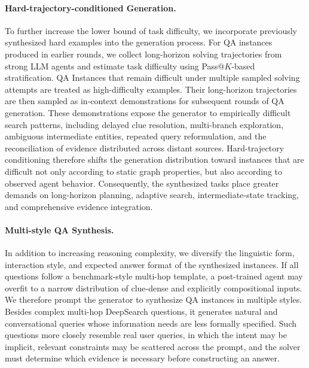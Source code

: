 \documentclass{huawei}
\begin{document}
\paragraph{Hard-trajectory-conditioned Generation.} To further increase the lower bound of task difficulty, we incorporate previously synthesized hard examples into the generation process. For QA instances produced in earlier rounds, we collect long-horizon solving trajectories from strong LLM agents and estimate task difficulty using Pass@$K$-based stratification. QA Instances that remain difficult under multiple sampled solving attempts are treated as high-difficulty examples. Their long-horizon trajectories are then sampled as in-context demonstrations for subsequent rounds of QA generation. These demonstrations expose the generator to empirically difficult search patterns, including delayed clue resolution, multi-branch exploration, ambiguous intermediate entities, repeated query reformulation, and the reconciliation of evidence distributed across distant sources. Hard-trajectory conditioning therefore shifts the generation distribution toward instances that are difficult not only according to static graph properties, but also according to observed agent behavior. Consequently, the synthesized tasks place greater demands on long-horizon planning, adaptive search, intermediate-state tracking, and comprehensive evidence integration.



\paragraph{Multi-style QA Synthesis.} In addition to increasing reasoning complexity, we diversify the linguistic form, interaction style, and expected answer format of the synthesized instances. If all questions follow a benchmark-style multi-hop template, a post-trained agent may overfit to a narrow distribution of clue-dense and explicitly compositional inputs. We therefore prompt the generator to synthesize QA instances in multiple styles. Besides complex multi-hop DeepSearch questions, it generates natural and conversational queries whose information needs are less formally specified. Such questions more closely resemble real user queries, in which the intent may be implicit, relevant constraints may be scattered across the prompt, and the solver must determine which evidence is necessary before constructing an answer.
\end{document}
